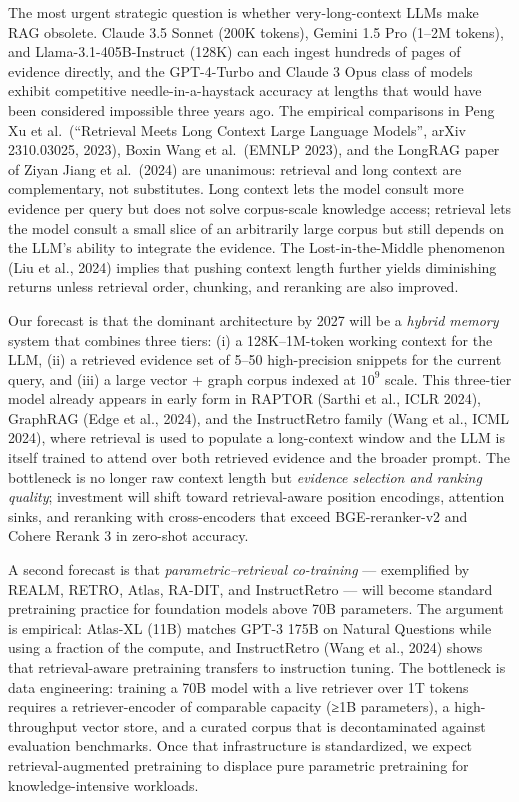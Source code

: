 The most urgent strategic question is whether very-long-context LLMs make RAG obsolete. Claude 3.5 Sonnet (200K tokens), Gemini 1.5 Pro (1--2M tokens), and Llama-3.1-405B-Instruct (128K) can each ingest hundreds of pages of evidence directly, and the GPT-4-Turbo and Claude 3 Opus class of models exhibit competitive needle-in-a-haystack accuracy at lengths that would have been considered impossible three years ago. The empirical comparisons in Peng Xu et al.~(``Retrieval Meets Long Context Large Language Models'', arXiv 2310.03025, 2023), Boxin Wang et al.~(EMNLP 2023), and the LongRAG paper of Ziyan Jiang et al.~(2024) are unanimous: retrieval and long context are complementary, not substitutes. Long context lets the model consult more evidence per query but does not solve corpus-scale knowledge access; retrieval lets the model consult a small slice of an arbitrarily large corpus but still depends on the LLM's ability to integrate the evidence. The Lost-in-the-Middle phenomenon (Liu et al., 2024) implies that pushing context length further yields diminishing returns unless retrieval order, chunking, and reranking are also improved.

Our forecast is that the dominant architecture by 2027 will be a \emph{hybrid memory} system that combines three tiers: (i) a 128K--1M-token working context for the LLM, (ii) a retrieved evidence set of 5--50 high-precision snippets for the current query, and (iii) a large vector + graph corpus indexed at \(10^9\) scale. This three-tier model already appears in early form in RAPTOR (Sarthi et al., ICLR 2024), GraphRAG (Edge et al., 2024), and the InstructRetro family (Wang et al., ICML 2024), where retrieval is used to populate a long-context window and the LLM is itself trained to attend over both retrieved evidence and the broader prompt. The bottleneck is no longer raw context length but \emph{evidence selection and ranking quality}; investment will shift toward retrieval-aware position encodings, attention sinks, and reranking with cross-encoders that exceed BGE-reranker-v2 and Cohere Rerank 3 in zero-shot accuracy.

A second forecast is that \emph{parametric--retrieval co-training} --- exemplified by REALM, RETRO, Atlas, RA-DIT, and InstructRetro --- will become standard pretraining practice for foundation models above 70B parameters. The argument is empirical: Atlas-XL (11B) matches GPT-3 175B on Natural Questions while using a fraction of the compute, and InstructRetro (Wang et al., 2024) shows that retrieval-aware pretraining transfers to instruction tuning. The bottleneck is data engineering: training a 70B model with a live retriever over 1T tokens requires a retriever-encoder of comparable capacity (≥1B parameters), a high-throughput vector store, and a curated corpus that is decontaminated against evaluation benchmarks. Once that infrastructure is standardized, we expect retrieval-augmented pretraining to displace pure parametric pretraining for knowledge-intensive workloads.

